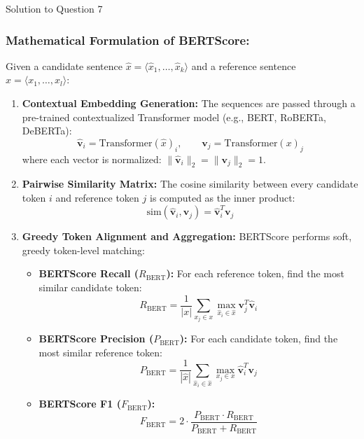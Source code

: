 \documentclass[11pt,a4paper]{article}
\begin{document}
\begin{solutionbox}{Solution to Question 7}
\subsubsection*{Mathematical Formulation of BERTScore:}
Given a candidate sentence $\hat{x} = \langle \hat{x}_1, \dots, \hat{x}_k \rangle$ and a reference sentence $x = \langle x_1, \dots, x_l \rangle$:
\begin{enumerate}[label=\textbf{\arabic*.}]
    \item \textbf{Contextual Embedding Generation:}
    The sequences are passed through a pre-trained contextualized Transformer model (e.g., BERT, RoBERTa, DeBERTa):
    \begin{equation*}
    \hat{\mathbf{v}}_i = \text{Transformer}(\hat{x})_i, \qquad \mathbf{v}_j = \text{Transformer}(x)_j
    \end{equation*}
    where each vector is normalized: $\|\hat{\mathbf{v}}_i\|_2 = \|\mathbf{v}_j\|_2 = 1$.
    \item \textbf{Pairwise Similarity Matrix:}
    The cosine similarity between every candidate token $i$ and reference token $j$ is computed as the inner product:
    \begin{equation*}
    \text{sim}(\hat{\mathbf{v}}_i, \mathbf{v}_j) = \hat{\mathbf{v}}_i^T \mathbf{v}_j
    \end{equation*}
    \item \textbf{Greedy Token Alignment and Aggregation:}
    BERTScore performs soft, greedy token-level matching:
    \begin{itemize}
        \item \textbf{BERTScore Recall ($R_{\text{BERT}}$):} For each reference token, find the most similar candidate token:
        \begin{equation*}
        R_{\text{BERT}} = \frac{1}{|x|} \sum_{x_j \in x} \max_{\hat{x}_i \in \hat{x}} \mathbf{v}_j^T \hat{\mathbf{v}}_i
        \end{equation*}
        \item \textbf{BERTScore Precision ($P_{\text{BERT}}$):} For each candidate token, find the most similar reference token:
        \begin{equation*}
        P_{\text{BERT}} = \frac{1}{|\hat{x}|} \sum_{\hat{x}_i \in \hat{x}} \max_{x_j \in x} \hat{\mathbf{v}}_i^T \mathbf{v}_j
        \end{equation*}
        \item \textbf{BERTScore F1 ($F_{\text{BERT}}$):}
        \begin{equation*}
        F_{\text{BERT}} = 2 \cdot \frac{P_{\text{BERT}} \cdot R_{\text{BERT}}}{P_{\text{BERT}} + R_{\text{BERT}}}
        \end{equation*}
    \end{itemize}
\end{enumerate}


\end{solutionbox}
\end{document}
